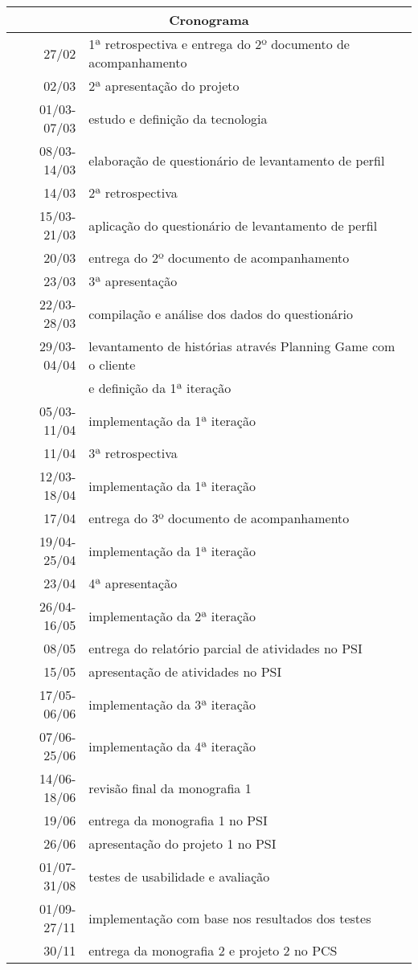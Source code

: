 \documentclass[a4paper,12pt,font=plain,header=plain]{abnt}
\begin{document}
	\begin{tabular}[|l|]{ |r|l| }
	\hline
		\multicolumn{2}{|c|}{\textbf{Cronograma}} \\
	\hline
		27/02 & 1ª retrospectiva e entrega do 2º documento de acompanhamento \\
	\hline
		02/03 & 2ª apresentação do projeto \\
	\hline
		01/03-07/03 & estudo e definição da tecnologia \\
	\hline
		08/03-14/03 & elaboração de questionário de levantamento de perfil \\
	\hline
		14/03 & 2ª retrospectiva \\
	\hline
		15/03-21/03 & aplicação do questionário de levantamento de perfil \\
	\hline
		20/03 & entrega do 2º documento de acompanhamento \\
	\hline
		23/03 & 3ª apresentação \\
	\hline
		22/03-28/03 & compilação e análise dos dados do questionário \\
	\hline
		29/03-04/04 & levantamento de histórias através Planning Game com o cliente \\
			    & e definição da 1ª iteração \\
	\hline
		05/03-11/04 & implementação da 1ª iteração \\
	\hline
		11/04 & 3ª retrospectiva \\
	\hline
		12/03-18/04 & implementação da 1ª iteração \\
	\hline
		17/04 & entrega do 3º documento de acompanhamento \\
	\hline
		19/04-25/04 & implementação da 1ª iteração \\
	\hline
		23/04 & 4ª apresentação \\
	\hline
		26/04-16/05 & implementação da 2ª iteração \\
	\hline
		08/05 & entrega do relatório parcial de atividades no PSI \\
	\hline
		15/05 & apresentação de atividades no PSI \\
	\hline
		17/05-06/06 & implementação da 3ª iteração \\
	\hline
		07/06-25/06 & implementação da 4ª iteração \\
	\hline
		14/06-18/06 & revisão final da monografia 1 \\
	\hline
		19/06 & entrega da monografia 1 no PSI \\
	\hline
		26/06 & apresentação do projeto 1 no PSI \\
	\hline
		01/07-31/08 & testes de usabilidade e avaliação \\
	\hline
		01/09-27/11 & implementação com base nos resultados dos testes \\
	\hline
		30/11 & entrega da monografia 2 e projeto 2 no PCS \\
	\hline
	\end{tabular} \\

  
\end{document}

